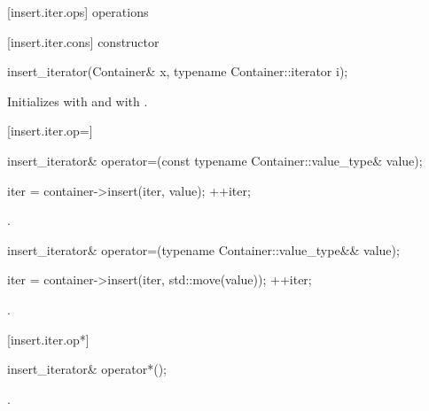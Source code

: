[insert.iter.ops]{ operations}

[insert.iter.cons]{ constructor}

%
\begin{itemdecl}
insert_iterator(Container& x, typename Container::iterator i);
\end{itemdecl}

\begin{itemdescr}
\pnum
\effects
Initializes
with  and
with .
\end{itemdescr}

[insert.iter.op=]{}

%
\begin{itemdecl}
insert_iterator& operator=(const typename Container::value_type& value);
\end{itemdecl}

\begin{itemdescr}
\pnum
\effects
\begin{codeblock}
iter = container->insert(iter, value);
++iter;
\end{codeblock}

\pnum
\returns
{}.
\end{itemdescr}

%
\begin{itemdecl}
insert_iterator& operator=(typename Container::value_type&& value);
\end{itemdecl}

\begin{itemdescr}
\pnum
\effects
\begin{codeblock}
iter = container->insert(iter, std::move(value));
++iter;
\end{codeblock}

\pnum
\returns
{}.
\end{itemdescr}

[insert.iter.op*]{}

%
\begin{itemdecl}
insert_iterator& operator*();
\end{itemdecl}

\begin{itemdescr}
\pnum
\returns
{}.
\end{itemdescr}

